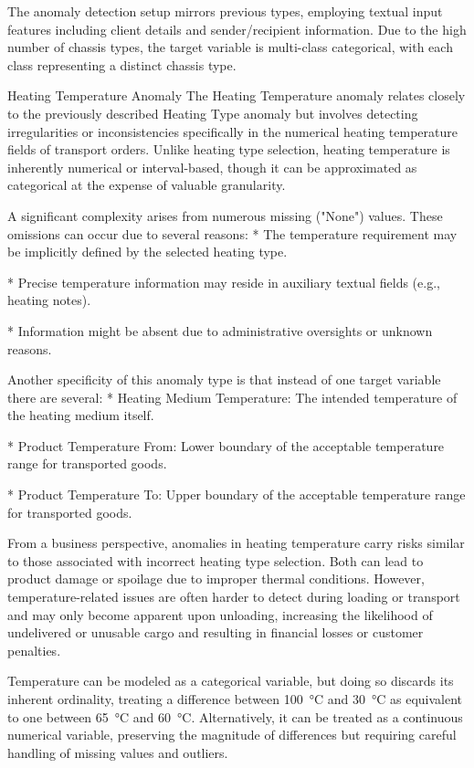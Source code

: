 The anomaly detection setup mirrors previous types, employing textual input features including client details and sender/recipient information. Due to the high number of chassis types, the target variable is multi-class categorical, with each class representing a distinct chassis type.

\sec Heating Temperature Anomaly
The Heating Temperature anomaly relates closely to the previously described Heating Type anomaly but involves detecting irregularities or inconsistencies specifically in the numerical heating temperature fields of transport orders. Unlike heating type selection, heating temperature is inherently numerical or interval-based, though it can be approximated as categorical at the expense of valuable granularity.

A significant complexity arises from numerous missing ("None") values. These omissions can occur due to several reasons:
\begitems
* The temperature requirement may be implicitly defined by the selected heating type.

* Precise temperature information may reside in auxiliary textual fields (e.g., heating notes).

* Information might be absent due to administrative oversights or unknown reasons.
\enditems

Another specificity of this anomaly type is that instead of one target variable there are several:
\begitems
* Heating Medium Temperature: The intended temperature of the heating medium itself.

* Product Temperature From: Lower boundary of the acceptable temperature range for transported goods.

* Product Temperature To: Upper boundary of the acceptable temperature range for transported goods.
\enditems

From a business perspective, anomalies in heating temperature carry risks similar to those associated with incorrect heating type selection. Both can lead to product damage or spoilage due to improper thermal conditions. However, temperature-related issues are often harder to detect during loading or transport and may only become apparent upon unloading, increasing the likelihood of undelivered or unusable cargo and resulting in financial losses or customer penalties.

Temperature can be modeled as a categorical variable, but doing so discards its inherent ordinality, treating a difference between 100~°C and 30~°C as equivalent to one between 65~°C and 60~°C. Alternatively, it can be treated as a continuous numerical variable, preserving the magnitude of differences but requiring careful handling of missing values and outliers.
